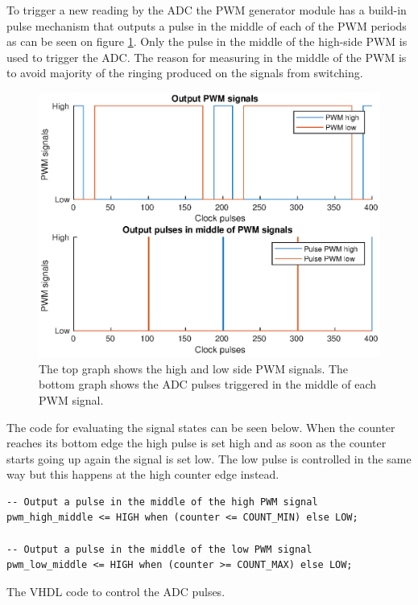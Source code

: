 To trigger a new reading by the ADC the PWM generator module has a build-in pulse mechanism that outputs a pulse in the middle of each of the PWM periods as can be seen on figure \ref{fig:adc_pulses}. Only the pulse in the middle of the high-side PWM is used to trigger the ADC. The reason for measuring in the middle of the PWM is to avoid majority of the ringing produced on the signals from switching.

\begin{figure}[H]
	\centering
	\includegraphics[width=0.8 \textwidth]{pictures/software/adc_pulses.eps}
	\caption{The top graph shows the high and low side PWM signals. The bottom graph shows the ADC pulses triggered in the middle of each PWM signal.}
	\label{fig:adc_pulses}
\end{figure}

The code for evaluating the signal states can be seen below. 
When the counter reaches its bottom edge the high pulse is set high and as soon as the counter starts going up again the signal is set low. The low pulse is controlled in the same way but this happens at the high counter edge instead.

\begin{verbatim}
-- Output a pulse in the middle of the high PWM signal
pwm_high_middle <= HIGH when (counter <= COUNT_MIN) else LOW;

-- Output a pulse in the middle of the low PWM signal
pwm_low_middle <= HIGH when (counter >= COUNT_MAX) else LOW;
\end{verbatim}
\begin{center}
    The VHDL code to control the ADC pulses.
\end{center}


